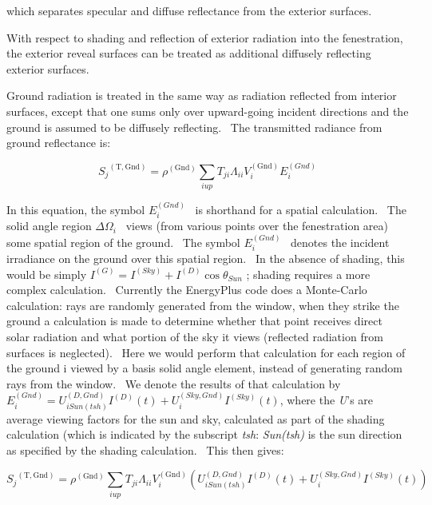 which separates specular and diffuse reflectance from the exterior surfaces.

With respect to shading and reflection of exterior radiation into the fenestration, the exterior reveal surfaces can be treated as additional diffusely reflecting exterior surfaces.

Ground radiation is treated in the same way as radiation reflected from interior surfaces, except that one sums only over upward-going incident directions and the ground is assumed to be diffusely reflecting.~ The transmitted radiance from ground reflectance is:

\begin{equation}
{S_j}^{{\mathrm{(T, Gnd)}}} = {\rho ^{{\mathrm{(Gnd)}}}}\sum\limits_{i{\mathrm{ }}up} {{T_{ji}}{\Lambda_{ii}}V_i^{{\mathrm{(Gnd)}}}E_i^{(Gnd)}}
\label{eq:SjTGndEquation}
\end{equation}

In this equation, the symbol \(E_i^{(Gnd)}\) ~is shorthand for a spatial calculation.~ The solid angle region \(\Delta {\Omega_i}\) ~views (from various points over the fenestration area) some spatial region of the ground.~ The symbol \(E_i^{(Gnd)}\) ~denotes the incident irradiance on the ground over this spatial region.~ In the absence of shading, this would be simply \({I^{(G)}} = {I^{(Sky)}} + {I^{(D)}}\cos {\theta_{Sun}}\) ; shading requires a more complex calculation.~ Currently the EnergyPlus code does a Monte-Carlo calculation: rays are randomly generated from the window, when they strike the ground a calculation is made to determine whether that point receives direct solar radiation and what portion of the sky it views (reflected radiation from surfaces is neglected).~ Here we would perform that calculation for each region of the ground i viewed by a basis solid angle element, instead of generating random rays from the window.~ We denote the results of that calculation by \(E_i^{(Gnd)} = U_{i{\mathrm{ }}Sun(tsh)}^{(D,Gnd)}{I^{(D)}}(t) + U_i^{(Sky,Gnd)}{I^{(Sky)}}(t)\), where the \emph{U}'s are average viewing factors for the sun and sky, calculated as part of the shading calculation (which is indicated by the subscript \emph{tsh}: \emph{Sun(tsh)} is the sun direction as specified by the shading calculation.~ This then gives:

\begin{equation}
{S_j}^{{\mathrm{(T, Gnd)}}} = {\rho ^{{\mathrm{(Gnd)}}}}\sum\limits_{i{\mathrm{ }}up} {{T_{ji}}{\Lambda_{ii}}V_i^{{\mathrm{(Gnd)}}}\left( {U_{i{\mathrm{ }}Sun(tsh)}^{(D,Gnd)}{I^{(D)}}(t) + U_i^{(Sky,Gnd)}{I^{(Sky)}}(t)} \right)}
\end{equation}

